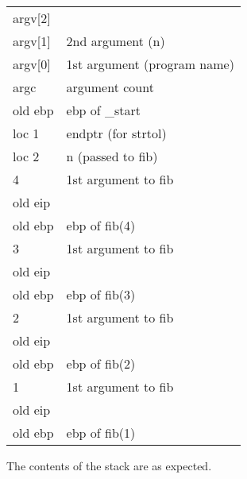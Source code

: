 \documentclass[12pt,a4paper]{article}
\begin{document}
\begin{tabularx}{\textwidth}{XX}
argv[2] &                                   \\
argv[1] &       2nd argument (n)            \\
argv[0] &       1st argument (program name) \\
argc    &       argument count              \\
old ebp &       ebp of \_start              \\
loc 1   &       endptr (for strtol)         \\
loc 2   &       n (passed to fib)           \\
4       &       1st argument to fib         \\
old eip &                                   \\
old ebp &       ebp of fib(4)               \\
3       &       1st argument to fib         \\
old eip &                                   \\
old ebp &       ebp of fib(3)               \\
2       &       1st argument to fib         \\
old eip &                                   \\
old ebp &       ebp of fib(2)               \\
1       &       1st argument to fib         \\
old eip &                                   \\
old ebp &       ebp of fib(1)               \\
\end{tabularx}

The contents of the stack are as expected.
\end{document}
